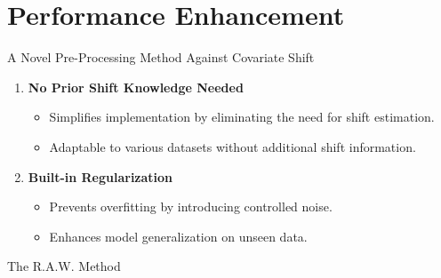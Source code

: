 \section{Performance Enhancement}



\begin{frame}{A Novel Pre-Processing Method Against Covariate Shift}
    \begin{enumerate}
        \item \textbf{No Prior Shift Knowledge Needed}
        \begin{itemize}
            \item Simplifies implementation by eliminating the need for shift estimation.
            \item Adaptable to various datasets without additional shift information.
        \end{itemize}
        
        \item \textbf{Built-in Regularization}
        \begin{itemize}
            \item Prevents overfitting by introducing controlled noise.
            \item Enhances model generalization on unseen data.
        \end{itemize}
    \end{enumerate}
\end{frame}



\begin{frame}{The R.A.W. Method}
\end{frame}


